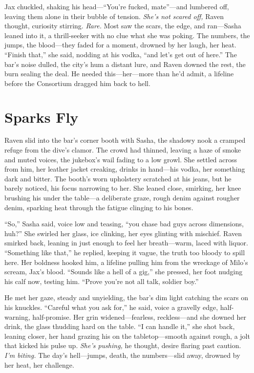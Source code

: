 \documentclass[12pt]{book}
\begin{document}
Jax chuckled, shaking his head—“You’re fucked, mate”—and lumbered off, leaving them alone in their bubble of tension. \textit{She’s not scared off,} Raven thought, curiosity stirring. \textit{Rare.} Most saw the scars, the edge, and ran—Sasha leaned into it, a thrill-seeker with no clue what she was poking. The numbers, the jumps, the blood—they faded for a moment, drowned by her laugh, her heat. “Finish that,” she said, nodding at his vodka, “and let’s get out of here.” The bar’s noise dulled, the city’s hum a distant lure, and Raven downed the rest, the burn sealing the deal. He needed this—her—more than he’d admit, a lifeline before the Consortium dragged him back to hell.

\section{Sparks Fly}

Raven slid into the bar’s corner booth with Sasha, the shadowy nook a cramped refuge from the dive’s clamor. The crowd had thinned, leaving a haze of smoke and muted voices, the jukebox’s wail fading to a low growl. She settled across from him, her leather jacket creaking, drinks in hand—his vodka, her something dark and bitter. The booth’s worn upholstery scratched at his jeans, but he barely noticed, his focus narrowing to her. She leaned close, smirking, her knee brushing his under the table—a deliberate graze, rough denim against rougher denim, sparking heat through the fatigue clinging to his bones.

“So,” Sasha said, voice low and teasing, “you chase bad guys across dimensions, huh?” She swirled her glass, ice clinking, her eyes glinting with mischief. Raven smirked back, leaning in just enough to feel her breath—warm, laced with liquor. “Something like that,” he replied, keeping it vague, the truth too bloody to spill here. Her boldness hooked him, a lifeline pulling him from the wreckage of Milo’s scream, Jax’s blood. “Sounds like a hell of a gig,” she pressed, her foot nudging his calf now, testing him. “Prove you’re not all talk, soldier boy.”

He met her gaze, steady and unyielding, the bar’s dim light catching the scars on his knuckles. “Careful what you ask for,” he said, voice a gravelly edge, half-warning, half-promise. Her grin widened—fearless, reckless—and she downed her drink, the glass thudding hard on the table. “I can handle it,” she shot back, leaning closer, her hand grazing his on the tabletop—smooth against rough, a jolt that kicked his pulse up. \textit{She’s pushing,} he thought, desire flaring past caution. \textit{I’m biting.} The day’s hell—jumps, death, the numbers—slid away, drowned by her heat, her challenge.
\end{document}
